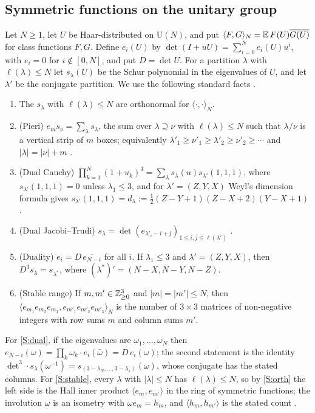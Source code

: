 \documentclass[11pt,colorlinks]{charlie}
\newcommand{\ip}[2]{\langle #1,#2\rangle}
\begin{document}
\subsection{Symmetric functions on the unitary group}
Let $N\ge1$, let $U$ be Haar-distributed on $\mathrm U(N)$, and put $\ip FG_N=\E\,F(U)\overline{G(U)}$ for class functions $F,G$. Define $e_i(U)$ by $\det(I+uU)=\sum_{i=0}^Ne_i(U)u^i$, with $e_i=0$ for $i\notin[0,N]$, and put $D=\det U$. For a partition $\lambda$ with $\ell(\lambda)\le N$ let $s_\lambda(U)$ be the Schur polynomial in the eigenvalues of $U$, and let $\lambda'$ be the conjugate partition. We use the following standard facts \cite{Mac,BG}.
\begin{enumerate}[label=(S\arabic*)]
\item\label{S:orth} The $s_\lambda$ with $\ell(\lambda)\le N$ are orthonormal for $\ip\cdot\cdot_N$.
\item\label{S:pieri} (Pieri) $e_ms_\nu=\sum_\lambda s_\lambda$, the sum over $\lambda\supseteq\nu$ with $\ell(\lambda)\le N$ such that $\lambda/\nu$ is a vertical strip of $m$ boxes; equivalently $\lambda'_1\ge\nu'_1\ge\lambda'_2\ge\nu'_2\ge\cdots$ and $|\lambda|=|\nu|+m$ \cite[I.(5.17)]{Mac}.
\item\label{S:cauchy} (Dual Cauchy) $\prod_{k=1}^N(1+u_k)^3=\sum_\lambda s_\lambda(u)s_{\lambda'}(1,1,1)$, where $s_{\lambda'}(1,1,1)=0$ unless $\lambda_1\le3$, and for $\lambda'=(Z,Y,X)$ Weyl's dimension formula gives $s_{\lambda'}(1,1,1)=d_\lambda:=\tfrac12(Z-Y+1)(Z-X+2)(Y-X+1)$ \cite[I.(4.3$'$)]{Mac}.
\item\label{S:jt} (Dual Jacobi--Trudi) $s_\lambda=\det(e_{\lambda'_i-i+j})_{1\le i,j\le\ell(\lambda')}$ \cite[I.(3.5)]{Mac}.
\item\label{S:dual} (Duality) $e_i=D\,\overline{e_{N-i}}$ for all $i$. If $\lambda_1\le3$ and $\lambda'=(Z,Y,X)$, then $D^3\overline{s_\lambda}=s_{\lambda^*}$, where $(\lambda^*)'=(N-X,N-Y,N-Z)$.
\item\label{S:stable} (Stable range) If $m,m'\in\mathbb{Z}_{\ge0}^3$ and $|m|=|m'|\le N$, then $\ip{e_{m_1}e_{m_2}e_{m_3}}{e_{m'_1}e_{m'_2}e_{m'_3}}_N$ is the number of $3\times3$ matrices of non-negative integers with row sums $m$ and column sums $m'$.
\end{enumerate}
For \ref{S:dual}, if the eigenvalues are $\omega_1,\dots,\omega_N$ then $e_{N-i}(\omega)=\prod_k\omega_k\cdot e_i(\bar\omega)=D\,\overline{e_i(\omega)}$; the second statement is the identity $\det^3\cdot s_\lambda(\omega^{-1})=s_{(3-\lambda_N,\dots,3-\lambda_1)}(\omega)$, whose conjugate has the stated columns. For \ref{S:stable}, every $\lambda$ with $|\lambda|\le N$ has $\ell(\lambda)\le N$, so by \ref{S:orth} the left side is the Hall inner product $\ip{e_m}{e_{m'}}$ in the ring of symmetric functions; the involution $\omega$ is an isometry with $\omega e_m=h_m$, and $\ip{h_m}{h_{m'}}$ is the stated count \cite[\S\S7.5, 7.9]{St}.
\end{document}
